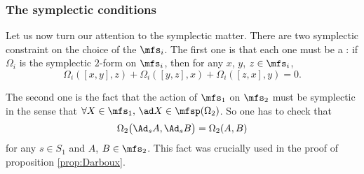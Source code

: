 \subsubsection*{The symplectic conditions}

Let us now turn our attention to the symplectic matter. There are two symplectic constraint on the choice of the $\mfs_i$. The first one is that each one must be a : if $\Omega_i$ is the symplectic $2$-form on $\mfs_i$, then for any $x$, $y$, $z\in\mfs_i$,
\begin{equation}\label{eq:symple_Lie}
\Omega_i([x,y],z)+\Omega_i([y,z],x)+\Omega_i([z,x],y)=0.
\end{equation}

The second one is the fact that the action of $\mfs_1$ on $\mfs_2$ must be symplectic in the sense that 
$\forall X\in\mfs_1,\, \ad X\in\mfsp (\Omega_2)$. So one has to check that 
\begin{equation}
   \Omega_2\big(  \Ad_s A,\Ad_s B   \big)=\Omega_2(A,B)
\end{equation}
for any $s\in S_1$ and $A$, $B\in\mfs_2$. This fact was crucially used in the proof of proposition \ref{prop:Darboux}.

